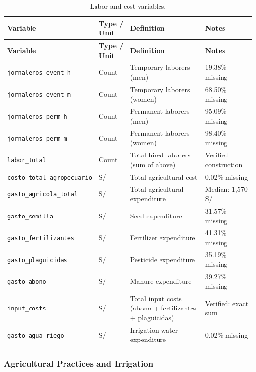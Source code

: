 \documentclass[11pt,a4paper]{article}
\begin{document}
\begin{longtable}{L{3cm}L{2.5cm}L{5cm}L{3.5cm}}
\caption{Labor and cost variables.} \\
\toprule
\textbf{Variable} & \textbf{Type / Unit} & \textbf{Definition} & \textbf{Notes} \\
\midrule
\endfirsthead
\toprule
\textbf{Variable} & \textbf{Type / Unit} & \textbf{Definition} & \textbf{Notes} \\
\midrule
\endhead
\bottomrule
\endlastfoot
\texttt{jornaleros\_event\_h} & Count & Temporary laborers (men) & 19.38\% missing \\
\texttt{jornaleros\_event\_m} & Count & Temporary laborers (women) & 68.50\% missing \\
\texttt{jornaleros\_perm\_h} & Count & Permanent laborers (men) & 95.09\% missing \\
\texttt{jornaleros\_perm\_m} & Count & Permanent laborers (women) & 98.40\% missing \\
\texttt{labor\_total} & Count & Total hired laborers (sum of above) & Verified construction \\
\texttt{costo\_total\_agropecuario} & S/ & Total agricultural cost & 0.02\% missing \\
\texttt{gasto\_agricola\_total} & S/ & Total agricultural expenditure & Median: 1,570 S/ \\
\texttt{gasto\_semilla} & S/ & Seed expenditure & 31.57\% missing \\
\texttt{gasto\_fertilizantes} & S/ & Fertilizer expenditure & 41.31\% missing \\
\texttt{gasto\_plaguicidas} & S/ & Pesticide expenditure & 35.19\% missing \\
\texttt{gasto\_abono} & S/ & Manure expenditure & 39.27\% missing \\
\texttt{input\_costs} & S/ & Total input costs (abono + fertilizantes + plaguicidas) & Verified: exact sum \\
\texttt{gasto\_agua\_riego} & S/ & Irrigation water expenditure & 0.02\% missing \\
\end{longtable}

\subsubsection{Agricultural Practices and Irrigation}
\end{document}
